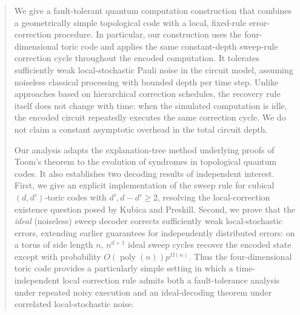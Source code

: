 \begin{abstract}
We give a fault-tolerant quantum computation construction that combines a geometrically simple topological code with a local, fixed-rule error-correction procedure.  In particular, our construction uses the four-dimensional toric code and applies the same constant-depth sweep-rule correction cycle throughout the encoded computation.  It tolerates sufficiently weak local-stochastic Pauli noise in the circuit model, assuming noiseless classical processing with bounded depth per time step.  Unlike approaches based on hierarchical correction schedules, the recovery rule itself does not change with time: when the simulated computation is idle, the encoded circuit repeatedly executes the same correction cycle.  We do not claim a constant asymptotic overhead in the total circuit depth.

Our analysis adapts the explanation-tree method underlying proofs of Toom's theorem to the evolution of syndromes in topological quantum codes.  It also establishes two decoding results of independent interest.  First, we give an explicit implementation of the sweep rule for cubical $(d,d')$-toric codes with $d',d-d'\geq 2$, resolving the local-correction existence question posed by Kubica and Preskill.  Second, we prove that the \emph{ideal} (noiseless) sweep decoder corrects sufficiently weak local-stochastic errors, extending earlier guarantees for independently distributed errors: on a torus of side length $n$, $n^{d+1}$ ideal sweep cycles recover the encoded state except with probability $O(\operatorname{poly}(n))p^{\Omega(n)}$.  Thus the four-dimensional toric code provides a particularly simple setting in which a time-independent local correction rule admits both a fault-tolerance analysis under repeated noisy execution and an ideal-decoding theorem under correlated local-stochastic noise.
\end{abstract}
